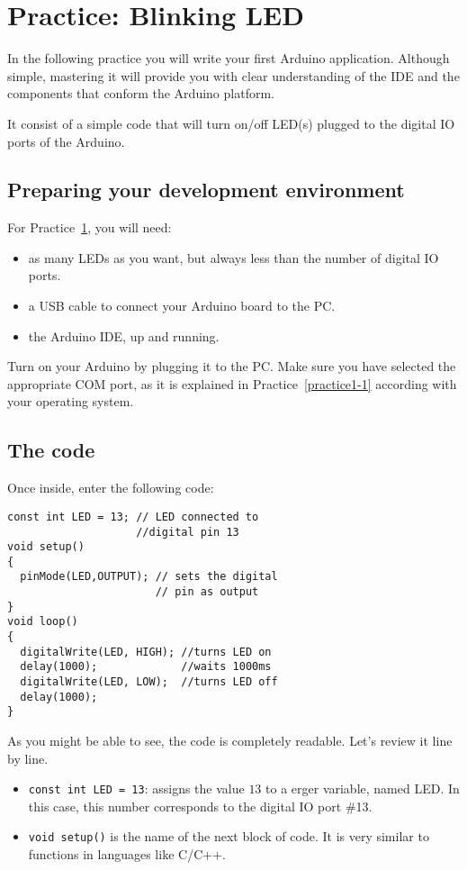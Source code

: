 \section{Practice: Blinking LED}\label{pract:blinkingLED}
In the following practice you will write your first Arduino application. Although simple, mastering it will provide you with clear understanding of the IDE and the components that conform the Arduino platform.

It consist of a simple code that will turn on/off LED(s) plugged to the digital IO ports of the Arduino.

\subsection{Preparing your development environment}
For Practice~\ref{pract:blinkingLED}, you will need:
\begin{itemize}
 \item as many LEDs as you want, but always less than the number of digital IO ports.
 \item a USB cable to connect your Arduino board to the PC.
 \item the Arduino IDE, up and running.
\end{itemize}

Turn on your Arduino by plugging it to the PC. Make sure you have selected the appropriate COM port, as it is explained in Practice~\ref{practice1-1} according with your operating system.

\subsection{The code}
Once inside, enter the following code:

\begin{verbatim}
const int LED = 13; // LED connected to 
                    //digital pin 13
void setup()
{
  pinMode(LED,OUTPUT); // sets the digital
                       // pin as output
}
void loop()
{
  digitalWrite(LED, HIGH); //turns LED on
  delay(1000);             //waits 1000ms
  digitalWrite(LED, LOW);  //turns LED off
  delay(1000);
}
\end{verbatim}

As you might be able to see, the code is completely readable. Let's review it line by line.

\begin{itemize}
 \item \texttt{const int LED = 13}: assigns the value $13$ to a \texttt{\color{red}{int}}erger variable, named LED. In this case, this number corresponds to the digital IO port \#13.
 \item \texttt{void setup()} is the name of the next block of code. It is very similar to functions in languages like C/C++.
\end{itemize}
